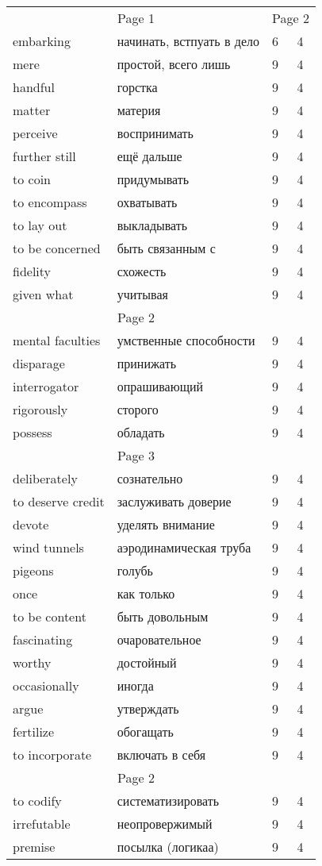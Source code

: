 \documentclass[12pt]{article}
\begin{document}
\begin{tabular}{ l l | l l | }
  \multicolumn{2}{c|}{Page 1} & \multicolumn{2}{c|}{Page 2} \\
  embarking & начинать, встпуать в дело & 6 & 4\\
  mere & простой, всего лишь & 9 & 4 \\
  handful & горстка & 9 & 4 \\
  matter & материя & 9 & 4 \\
  perceive & воспринимать & 9 & 4 \\
  further still & ещё дальше & 9 & 4 \\
  to coin & придумывать & 9 & 4 \\
  to encompass & охватывать & 9 & 4 \\
  to lay out & выкладывать & 9 & 4 \\
  to be concerned & быть связанным с & 9 & 4 \\
  fidelity & схожесть & 9 & 4 \\
  given what & учитывая & 9 & 4 \\ \cline{1-2}

  \multicolumn{2}{c|}{Page 2} \\
  mental faculties & умственные способности & 9 & 4 \\
  disparage & принижать & 9 & 4 \\
  interrogator & опрашивающий & 9 & 4 \\
  rigorously & сторого & 9 & 4 \\
  possess & обладать & 9 & 4 \\ \cline{1-2}

  \multicolumn{2}{c|}{Page 3} \\
  deliberately & сознательно & 9 & 4 \\
  to deserve credit & заслуживать доверие & 9 & 4 \\
  devote & уделять внимание & 9 & 4 \\
  wind tunnels & аэродинамическая труба & 9 & 4 \\
  pigeons & голубь & 9 & 4 \\
  once & как только & 9 & 4 \\
  to be content & быть довольным & 9 & 4 \\
  fascinating & очаровательное & 9 & 4 \\
  worthy & достойный & 9 & 4 \\
  occasionally & иногда & 9 & 4 \\
  argue & утверждать & 9 & 4 \\
  fertilize  & обогащать & 9 & 4 \\
  to incorporate  & включать в себя & 9 & 4 \\

  \multicolumn{2}{c|}{Page 2} \\
  to codify & систематизировать & 9 & 4 \\
  irrefutable & неопровержимый & 9 & 4 \\
  premise & посылка (логикаа) & 9 & 4 \\

\end{tabular}
\end{document}

